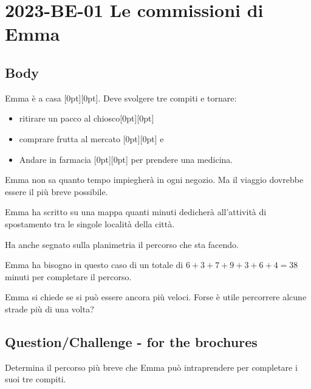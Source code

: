 \documentclass[a4paper,11pt]{report}
\newcommand{\taskGraphicsFolder}{..}
\begin{document}
\section*{\centering{} 2023-BE-01 Le commissioni di Emma}


\subsection*{Body}

Emma è a casa \raisebox{\dimexpr -0.5ex -0.2ex \relax}[0pt][0pt]{}.  Deve svolgere tre compiti
e tornare:

\begin{itemize}
  \item ritirare un pacco al chiosco\raisebox{\dimexpr -0.5ex -0.2ex \relax}[0pt][0pt]{}
  \item comprare frutta al mercato \raisebox{\dimexpr -0.5ex -0.2ex \relax}[0pt][0pt]{} e
  \item Andare in farmacia \raisebox{\dimexpr -0.5ex -0.2ex \relax}[0pt][0pt]{} per prendere una medicina.
\end{itemize}

Emma non sa quanto tempo impiegherà in ogni negozio.
Ma il viaggio dovrebbe essere il più breve possibile.

Emma ha scritto su una mappa quanti minuti dedicherà all’attività di
spostamento tra le singole località della città.

Ha anche segnato sulla planimetria il percorso che sta facendo.

Emma ha bisogno in questo caso di un totale di ${6 + 3 + 7 + 9 + 3 + 6 + 4 = 38}$ minuti per completare il percorso.

{\centering%
\par}

Emma si chiede se si può essere ancora più veloci.
Forse è utile percorrere alcune strade più di una volta?

{\em


\subsection*{Question/Challenge - for the brochures}

Determina il percorso più breve che Emma può intraprendere per completare i suoi tre compiti.

{\centering%
\par}

}
\end{document}
